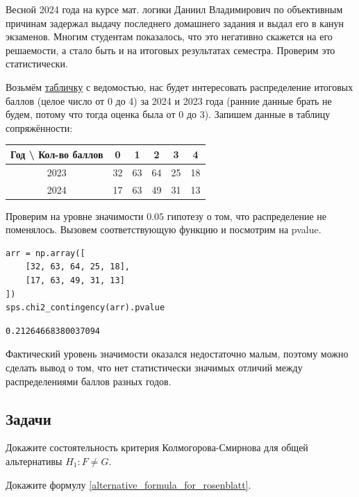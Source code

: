 \begin{example}
	Весной 2024 года на курсе мат. логики Даниил Владимирович по объективным причинам задержал выдачу последнего домашнего задания и выдал его в канун экзаменов. Многим студентам показалось, что это негативно скажется на его решаемости, а стало быть и на итоговых результатах семестра. Проверим это статистически.
	
	Возьмём \href{https://docs.google.com/spreadsheets/d/1z4qx7f4orruuMmBidFwpLw7IWZ3LgdYEI9zYjj71T_0/edit?usp=sharing}{табличку} с ведомостью, нас будет интересовать распределение итоговых баллов (целое число от 0 до 4) за 2024 и 2023 года (ранние данные брать не будем, потому что тогда оценка была от 0 до 3). Запишем данные в таблицу сопряжённости:
	\begin{center}
		\begin{tabular}{|c|c|c|c|c|c|}
		\hline
			Год {\textbackslash} Кол-во баллов & 0 & 1 & 2 & 3 & 4\\
			\hline
			2023 & 32 & 63 & 64 & 25 & 18\\
			\hline
			2024 & 17 & 63 & 49 & 31 & 13\\
			\hline
		\end{tabular}
	\end{center}
	
	Проверим на уровне значимости $0.05$ гипотезу о том, что распределение не поменялось. Вызовем соответствующую функцию и посмотрим на pvalue.
	\begin{verbatim}
arr = np.array([
    [32, 63, 64, 25, 18],
    [17, 63, 49, 31, 13]
])
sps.chi2_contingency(arr).pvalue
	\end{verbatim}
	\begin{lstlisting}
0.21264668380037094
	\end{lstlisting}
	
	Фактический уровень значимости оказался недостаточно малым, поэтому можно сделать вывод о том, что нет статистически значимых отличий между распределениями баллов разных годов.
\end{example}

\subsection*{Задачи}

\begin{problem}
	Докажите состоятельность критерия Колмогорова-Смирнова для общей альтернативы $H_1\colon F \ne G$.
\end{problem}

\begin{problem}
	Докажите формулу \eqref{alternative_formula_for_rosenblatt}.
\end{problem}



